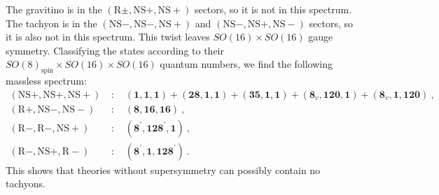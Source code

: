 The gravitino is in the $(\mathrm{R}\pm,\mathrm{NS}+,\mathrm{NS}+)$ sectors, so it is not in this spectrum. The tachyon is in the $(\mathrm{NS}-,\mathrm{NS}-,\mathrm{NS}+)$ and $(\mathrm{NS}-,\mathrm{NS}+,\mathrm{NS}-)$ sectors, so it is also not in this spectrum. This twist leaves $SO(16)\times SO(16)$ gauge symmetry. Classifying the states according to their $SO(8)_{\text{spin}}\times SO(16)\times SO(16)$ quantum numbers, we find the following massless spectrum:
\begin{align*}
	(\mathrm{NS}+,\mathrm{NS}+,\mathrm{NS}+)&\::\quad (\mathbf{1},\mathbf{1},\mathbf{1}) 
	+ (\mathbf{28},\mathbf{1},\mathbf{1}) + (\mathbf{35},\mathbf{1},\mathbf{1})
	+ (\mathbf{8}_{v},\mathbf{120},\mathbf{1}) + (\mathbf{8}_{v},\mathbf{1},\mathbf{120}) \:, \\
	(\mathrm{R}+,\mathrm{NS}-,\mathrm{NS}-)&\::\quad (\mathbf{8},\mathbf{16},\mathbf{16})\: , \\
	(\mathrm{R}-,\mathrm{R}-,\mathrm{NS}+)&\::\quad  (\mathbf{8}^{\prime},\mathbf{128}^{\prime},\mathbf{1})\:, \\
	(\mathrm{R}-,\mathrm{NS}+,\mathrm{R}-)&\::\quad (\mathbf{8}^{\prime},\mathbf{1},\mathbf{128}^{\prime})\:.
\end{align*}
This shows that theories without supersymmetry can possibly contain no tachyons.
